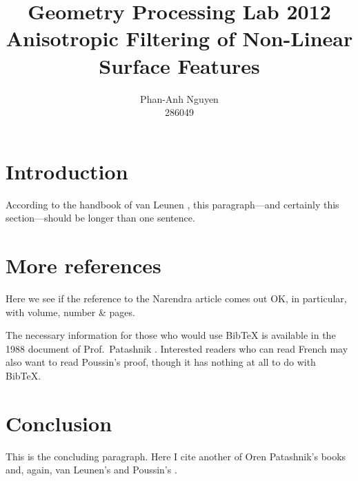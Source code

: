 \documentclass[11pt]{article}
\author{Phan-Anh Nguyen\\
		286049}
\title{Geometry Processing Lab 2012\\
	   Anisotropic Filtering of Non-Linear Surface Features}
\begin{document}
\maketitle

\section{Introduction}

According to the handbook of van Leunen \cite{Hildebrandt04anisotropicfiltering},
this paragraph---and certainly this
section---should be longer than one sentence.

\section{More references}

Here we see if the reference \cite{Hildebrandt04anisotropicfiltering}
to the Narendra article comes out OK, in particular,
with volume, number \& pages.

The necessary information for those who would use BibTeX
is available in the 1988 document of Prof.\ Patashnik \cite{Hildebrandt04anisotropicfiltering}.
Interested readers who can read French may also
want to read Poussin's proof\cite{Hildebrandt04anisotropicfiltering}, though
it has nothing at all to do with BibTeX.

\section{Conclusion}

This is the concluding paragraph.  Here I cite another of
Oren Patashnik's books\cite{Hildebrandt04anisotropicfiltering} and, again,
van Leunen's and Poussin's \cite{Hildebrandt04anisotropicfiltering,Hildebrandt04anisotropicfiltering}.

\end{document}
